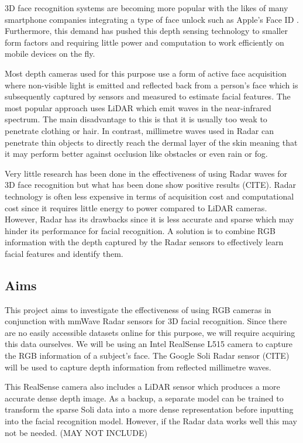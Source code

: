\documentclass{interim}
\begin{document}
3D face recognition systems are becoming more popular with the likes of many smartphone companies integrating a type of face unlock such as Apple's Face ID \cite{apple-faceid}. Furthermore, this demand has pushed this depth sensing technology to smaller form factors and requiring little power and computation to work efficiently on mobile devices on the fly.

Most depth cameras used for this purpose use a form of active face acquisition where non-visible light is emitted and reflected back from a person's face which is subsequently captured by sensors and measured to estimate facial features. The most popular approach uses LiDAR which emit waves in the near-infrared spectrum. The main disadvantage to this is that it is usually too weak to penetrate clothing or hair. In contrast, millimetre waves used in Radar can penetrate thin objects to directly reach the dermal layer of the skin meaning that it may perform better against occlusion like obstacles or even rain or fog.

Very little research has been done in the effectiveness of using Radar waves for 3D face recognition but what has been done show positive results \cite{}(CITE). Radar technology is often less expensive in terms of acquisition cost and computational cost since it requires little energy to power compared to LiDAR cameras. However, Radar has its drawbacks since it is less accurate and sparse which may hinder its performance for facial recognition. A solution is to combine RGB information with the depth captured by the Radar sensors to effectively learn facial features and identify them.

\subsection{Aims}
This project aims to investigate the effectiveness of using RGB cameras in conjunction with mmWave Radar sensors for 3D facial recognition. Since there are no easily accessible datasets online for this purpose, we will require acquiring this data ourselves. We will be using an Intel RealSense L515 \cite{intel-l515} camera to capture the RGB information of a subject's face. The Google Soli Radar sensor \cite{}(CITE) will be used to capture depth information from reflected millimetre waves. 

This RealSense camera also includes a LiDAR sensor which produces a more accurate dense depth image. As a backup, a separate model can be trained to transform the sparse Soli data into a more dense representation before inputting into the facial recognition model. However, if the Radar data works well this may not be needed. (MAY NOT INCLUDE)
\end{document}
